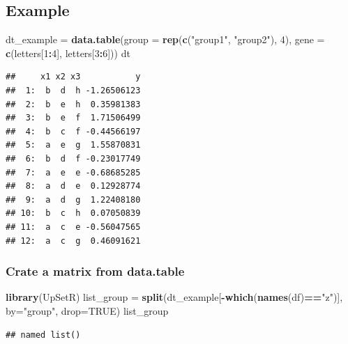 \documentclass[]{book}
\makeatletter
\newenvironment{Shaded}{\begin{snugshade}}{\end{snugshade}}
\newcommand{\DataTypeTok}[1]{\textcolor[rgb]{0.13,0.29,0.53}{#1}}
\newcommand{\DecValTok}[1]{\textcolor[rgb]{0.00,0.00,0.81}{#1}}
\newcommand{\KeywordTok}[1]{\textcolor[rgb]{0.13,0.29,0.53}{\textbf{#1}}}
\newcommand{\NormalTok}[1]{#1}
\newcommand{\OperatorTok}[1]{\textcolor[rgb]{0.81,0.36,0.00}{\textbf{#1}}}
\newcommand{\OtherTok}[1]{\textcolor[rgb]{0.56,0.35,0.01}{#1}}
\newcommand{\StringTok}[1]{\textcolor[rgb]{0.31,0.60,0.02}{#1}}
\newenvironment{kframe}{%
\medskip{}
\setlength{\fboxsep}{.8em}
 \def\at@end@of@kframe{}%
 \ifinner\ifhmode%
  \def\at@end@of@kframe{\end{minipage}}%
  \begin{minipage}{\columnwidth}%
 \fi\fi%
 \def\FrameCommand##1{\hskip\@totalleftmargin \hskip-\fboxsep
 \colorbox{shadecolor}{##1}\hskip-\fboxsep
     \hskip-\linewidth \hskip-\@totalleftmargin \hskip\columnwidth}%
 \MakeFramed {\advance\hsize-\width
   \@totalleftmargin\z@ \linewidth\hsize
   \@setminipage}}%
 {\par\unskip\endMakeFramed%
 \at@end@of@kframe}
\renewenvironment{Shaded}{\begin{kframe}}{\end{kframe}}
\makeatother
\begin{document}
\hypertarget{example}{%
\subsection{Example}\label{example}}

\begin{Shaded}
\begin{Highlighting}[]
\NormalTok{dt_example =}\StringTok{ }\KeywordTok{data.table}\NormalTok{(}\DataTypeTok{group =} \KeywordTok{rep}\NormalTok{(}\KeywordTok{c}\NormalTok{(}\StringTok{"group1"}\NormalTok{, }\StringTok{"group2"}\NormalTok{), }\DecValTok{4}\NormalTok{), }
                \DataTypeTok{gene =} \KeywordTok{c}\NormalTok{(letters[}\DecValTok{1}\OperatorTok{:}\DecValTok{4}\NormalTok{], letters[}\DecValTok{3}\OperatorTok{:}\DecValTok{6}\NormalTok{]))}
\NormalTok{dt}
\end{Highlighting}
\end{Shaded}

\begin{verbatim}
##     x1 x2 x3           y
##  1:  b  d  h -1.26506123
##  2:  b  e  h  0.35981383
##  3:  b  e  f  1.71506499
##  4:  b  c  f -0.44566197
##  5:  a  e  g  1.55870831
##  6:  b  d  f -0.23017749
##  7:  a  e  e -0.68685285
##  8:  a  d  e  0.12928774
##  9:  a  d  g  1.22408180
## 10:  b  c  h  0.07050839
## 11:  a  c  e -0.56047565
## 12:  a  c  g  0.46091621
\end{verbatim}

\hypertarget{crate-a-matrix-from-data.table}{%
\subsubsection{Crate a matrix from data.table}\label{crate-a-matrix-from-data.table}}

\begin{Shaded}
\begin{Highlighting}[]
\KeywordTok{library}\NormalTok{(UpSetR)}
\NormalTok{list_group =}\StringTok{ }\KeywordTok{split}\NormalTok{(dt_example[}\OperatorTok{-}\KeywordTok{which}\NormalTok{(}\KeywordTok{names}\NormalTok{(df)}\OperatorTok{==}\StringTok{"z"}\NormalTok{)], }\DataTypeTok{by=}\StringTok{"group"}\NormalTok{,  }\DataTypeTok{drop=}\OtherTok{TRUE}\NormalTok{)}
\NormalTok{list_group}
\end{Highlighting}
\end{Shaded}

\begin{verbatim}
## named list()
\end{verbatim}
\end{document}
